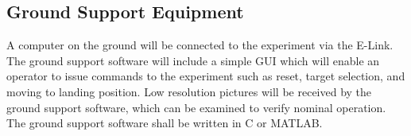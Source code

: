 \pagebreak
\subsection{Ground Support Equipment}\label{sec:4.9}
A computer on the ground will be connected to the experiment via the E-Link. The ground support software will include a simple GUI which will enable an operator to issue commands to the experiment such as reset, target selection, and moving to landing position. Low resolution pictures will be received by the ground support software, which can be examined to verify nominal operation. The ground support software shall be written in C or MATLAB.

\raggedbottom
